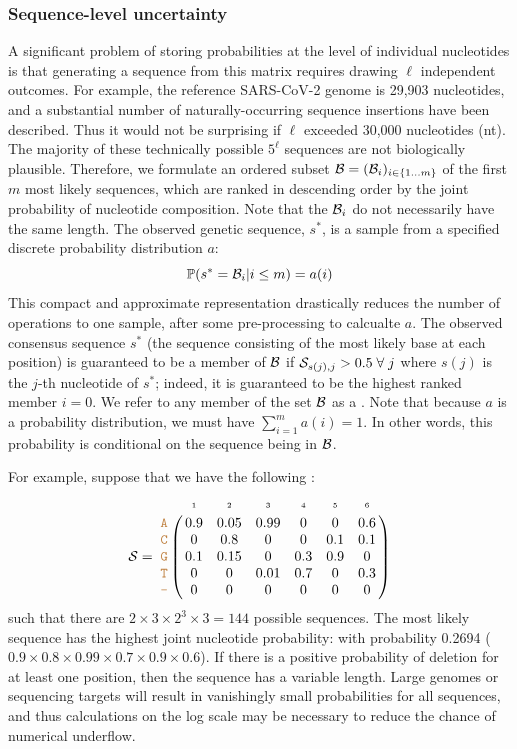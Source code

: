 \documentclass[10pt]{article}
\begin{document}
\subsubsection{Sequence-level uncertainty}

A significant problem of storing probabilities at the level of individual nucleotides is that generating a sequence from this matrix requires drawing $\ell$ independent outcomes.
For example, the reference SARS-CoV-2 genome is 29,903 nucleotides, and a substantial number of naturally-occurring sequence insertions have been described.
Thus it would not be surprising if $\ell$ exceeded 30,000 nucleotides (nt).
The majority of these technically possible $5^\ell$ sequences are not biologically plausible.
Therefore, we formulate an ordered subset $\mathcal{B} = (\mathcal{B}_i)_{i\in\{1\ldots m\} }$ of the first $m$ most likely sequences, which are ranked in descending order by the joint probability of nucleotide composition.
Note that the $\mathcal{B}_i$ do not necessarily have the same length.
The observed genetic sequence, $s^*$, is a sample from a specified discrete probability distribution $a$:
\begin{equation}
\mathbb{P}(s^* = \mathcal{B}_i | i \le m) = a(i)
\end{equation}
This compact and approximate representation drastically reduces the number of operations to one sample, after some pre-processing to calcualte $a$.
The observed consensus sequence $s^*$ (the sequence consisting of the most likely base at each position) is guaranteed to be a member of $\mathcal{B}$ if $\mathcal{S}_{s(j), j} > 0.5\;\forall\;j$ where $s(j)$ is the $j$-th nucleotide of $s^*$; indeed, it is guaranteed to be the highest ranked member $i=0$.
We refer to any member of the set $\mathcal{B}$ as a \emph{\slps}.
Note that because $a$ is a probability distribution, we must have $\sum_{i=1}^m a(i) = 1$.
In other words, this probability is conditional on the sequence being in $\mathcal{B}$.


For example, suppose that we have the following \nlps:
$$
\nps = 
\bordermatrix{
& \scriptscriptstyle{1} & \scriptscriptstyle{2}& \scriptscriptstyle{3}& \scriptscriptstyle{4} & \scriptscriptstyle{5} & \scriptscriptstyle{6} \cr
\sq{A} & 0.9 & 0.05   & 0.99 & 0 & 0 & 0.6\cr
\sq{C} & 0   & 0.8 & 0 & 0 & 0.1 & 0.1\cr
\sq{G} & 0.1 & 0.15 & 0 & 0.3 & 0.9 & 0\cr
\sq{T} & 0 & 0 & 0.01 & 0.7 & 0 & 0.3\cr
\sq{-} & 0 & 0 & 0 & 0 & 0 & 0\cr
}
$$
such that there are $2\times 3 \times 2^3 \times 3 = 144$ possible sequences.
The most likely sequence has the highest joint nucleotide probability:  with probability 0.2694 ($0.9\times 0.8\times 0.99 \times 0.7 \times 0.9 \times 0.6$).
If there is a positive probability of deletion for at least one position, then the sequence has a variable length.
Large genomes or sequencing targets will result in vanishingly small probabilities for all sequences, and thus calculations on the log scale may be necessary to reduce the chance of numerical underflow.
\end{document}
